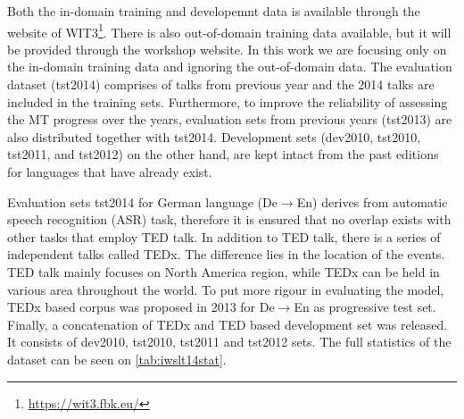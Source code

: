 Both the in-domain training and developemnt data is available through the website of WIT3\footnote{\url{https://wit3.fbk.eu/}}. There is also out-of-domain training data available, but it will be provided through the workshop website. In this work we are focusing only on the in-domain training data and ignoring the out-of-domain data. The evaluation dataset (tst2014) comprises of talks from previous year and the 2014 talks are included in the training sets. Furthermore, to improve the reliability of assessing the MT progress over the years, evaluation sets from previous years (tst2013) are also distributed together with tst2014. Development sets (dev2010, tst2010, tst2011, and tst2012) on the other hand, are kept intact from the past editions for languages that have already exist.

Evaluation sets tst2014 for German language (De$\rightarrow$En) derives from automatic speech recognition (ASR) task, therefore it is ensured that no overlap exists with other tasks that employ TED talk. In addition to TED talk, there is a series of independent talks called TEDx. The difference lies in the location of the events. TED talk mainly focuses on North America region, while TEDx can be held in various area throughout the world. To put more rigour in evaluating the model, TEDx based corpus was proposed in 2013 for De$\rightarrow$En as progressive test set. Finally, a concatenation of TEDx and TED based development set was released. It consists of dev2010, tst2010, tst2011 and tst2012 sets. The full statistics of the dataset can be seen on \ref{tab:iwslt14stat}.

